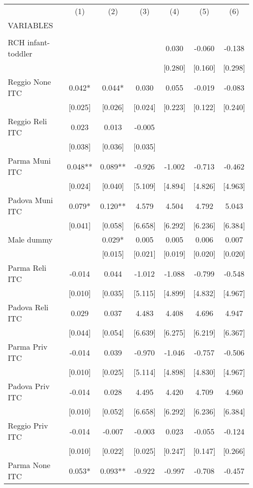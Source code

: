 \begin{tabular}{lcccccc} \hline
 & (1) & (2) & (3) & (4) & (5) & (6) \\
VARIABLES &  &  &  &  &  &  \\ \hline
 &  &  &  &  &  &  \\
RCH infant-toddler &  &  &  & 0.030 & -0.060 & -0.138 \\
 &  &  &  & [0.280] & [0.160] & [0.298] \\
Reggio None ITC & 0.042* & 0.044* & 0.030 & 0.055 & -0.019 & -0.083 \\
 & [0.025] & [0.026] & [0.024] & [0.223] & [0.122] & [0.240] \\
Reggio Reli ITC & 0.023 & 0.013 & -0.005 &  &  &  \\
 & [0.038] & [0.036] & [0.035] &  &  &  \\
Parma Muni ITC & 0.048** & 0.089** & -0.926 & -1.002 & -0.713 & -0.462 \\
 & [0.024] & [0.040] & [5.109] & [4.894] & [4.826] & [4.963] \\
Padova Muni ITC & 0.079* & 0.120** & 4.579 & 4.504 & 4.792 & 5.043 \\
 & [0.041] & [0.058] & [6.658] & [6.292] & [6.236] & [6.384] \\
Male dummy &  & 0.029* & 0.005 & 0.005 & 0.006 & 0.007 \\
 &  & [0.015] & [0.021] & [0.019] & [0.020] & [0.020] \\
Parma Reli ITC & -0.014 & 0.044 & -1.012 & -1.088 & -0.799 & -0.548 \\
 & [0.010] & [0.035] & [5.115] & [4.899] & [4.832] & [4.967] \\
Padova Reli ITC & 0.029 & 0.037 & 4.483 & 4.408 & 4.696 & 4.947 \\
 & [0.044] & [0.054] & [6.639] & [6.275] & [6.219] & [6.367] \\
Parma Priv ITC & -0.014 & 0.039 & -0.970 & -1.046 & -0.757 & -0.506 \\
 & [0.010] & [0.025] & [5.114] & [4.898] & [4.830] & [4.967] \\
Padova Priv ITC & -0.014 & 0.028 & 4.495 & 4.420 & 4.709 & 4.960 \\
 & [0.010] & [0.052] & [6.658] & [6.292] & [6.236] & [6.384] \\
Reggio Priv ITC & -0.014 & -0.007 & -0.003 & 0.023 & -0.055 & -0.124 \\
 & [0.010] & [0.022] & [0.025] & [0.247] & [0.147] & [0.266] \\
Parma None ITC & 0.053* & 0.093** & -0.922 & -0.997 & -0.708 & -0.457 \\

\end{tabular}
